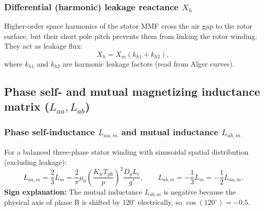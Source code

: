 \subsubsection{Differential (harmonic) leakage reactance $X_h$}
Higher-order space harmonics of the stator MMF cross the air gap to the rotor surface, but their short pole pitch prevents them from linking the rotor winding. They act as leakage flux:
\[
X_h = X_m(k_{h1} + k_{h2}),
\]
where \(k_{h1}\) and \(k_{h2}\) are harmonic leakage factors (read from Alger curves).

\subsection{Phase self- and mutual magnetizing inductance matrix ($L_{aa}, L_{ab}$)}

\subsubsection{Phase self-inductance $L_{aa,m}$ and mutual inductance $L_{ab,m}$}
For a balanced three-phase stator winding with sinusoidal spatial distribution (excluding leakage):
\[
L_{aa,m} = \frac{2}{3} L_m = \frac{2}{\pi}\mu_0\left(\frac{K_w T_{\mathrm{ph}}}{p}\right)^2\frac{D_g L_c}{g'},
\qquad
L_{ab,m} = -\frac{1}{3} L_m = -\frac{1}{2} L_{aa,m}.
\]
\textbf{Sign explanation:} The mutual inductance \(L_{ab,m}\) is negative because the physical axis of phase B is shifted by \(120^\circ\) electrically, so \(\cos(120^\circ) = -0.5\).

